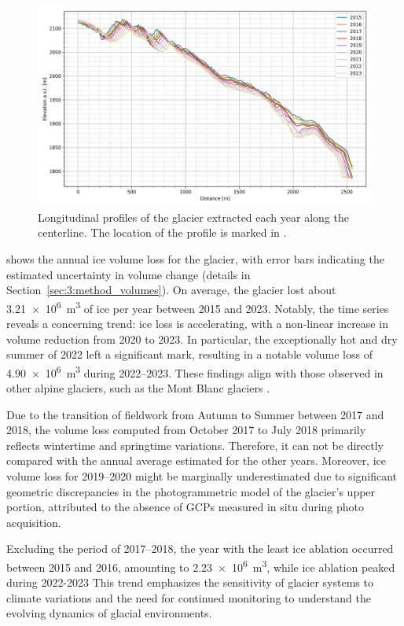 \begin{figure}[ht]
  \centering
  \includegraphics[width=\textwidth]{longitudinal_profiles.png}
  \caption{Longitudinal profiles of the glacier extracted each year along the centerline. The location of the profile is marked in .}
  \label{fig:3:profile_long}
\end{figure}

 shows the annual ice volume loss for the glacier, with error bars indicating the estimated uncertainty in volume change (details in Section~\ref{sec:3:method_volumes}).  
On average, the glacier lost about \SI{3.21e6}{\cubic\meter}  of ice per year between 2015 and 2023. 
Notably, the time series reveals a concerning trend: ice loss is accelerating, with a non-linear increase in volume reduction from 2020 to 2023.
In particular, the exceptionally hot and dry summer of 2022 left a significant mark, resulting in a notable volume loss of \SI{4.90e6}{\cubic\meter} during 2022--2023.
These findings align with those observed in other alpine glaciers, such as the Mont Blanc glaciers \citep{Berthier2023b_exceptional_thinning}.

Due to the transition of fieldwork from Autumn to Summer between 2017 and 2018, the volume loss computed from October 2017 to July 2018 primarily reflects wintertime and springtime variations.
Therefore, it can not be directly compared with the annual average estimated for the other years.
Moreover, ice volume loss for 2019--2020 might be marginally underestimated due to significant geometric discrepancies in the photogrammetric model of the glacier's upper portion, attributed to the absence of GCPs measured in situ during photo acquisition. 

Excluding the period of 2017--2018, the year with the least ice ablation occurred between 2015 and 2016, amounting to \SI{2.23e6}{\cubic\meter}, while ice ablation peaked during 2022-2023
This trend emphasizes the sensitivity of glacier systems to climate variations and the need for continued monitoring to understand the evolving dynamics of glacial environments.

